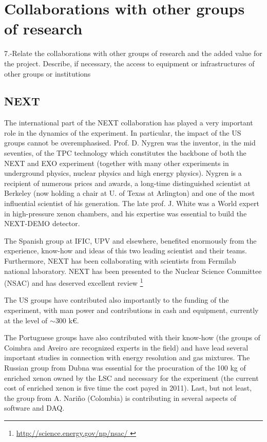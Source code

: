 \documentclass[a4paper,11pt,oneside]{article}
\begin{document}
\section{\bf \textsf{Collaborations with other groups of research}}

7.-Relate the collaborations with other groups of research and the added value for the project. Describe, if necessary, the access to equipment or infrastructures of other groups or institutions

\subsection*{NEXT}

The international part of the NEXT collaboration has played a very important role in the dynamics of the experiment. In particular, the impact of the US groups cannot be overemphasised. Prof. D. Nygren was the inventor, in the mid seventies, of the TPC technology which constitutes the backbone of both the NEXT and EXO experiment (together with many other experiments in underground physics, nuclear physics and high energy physics). Nygren is a recipient of numerous prices and awards, a long-time distinguished scientist at Berkeley (now holding a chair at U. of Texas at Arlington) and one of the most influential scientist of his generation. The late prof. J. White was a World expert in high-pressure xenon chambers, and his expertise was essential to build the NEXT-DEMO detector.

The Spanish group at IFIC, UPV and elsewhere, benefited enormously from the experience, know-how and ideas of this two leading scientist and their teams. Furthermore, NEXT has been collaborating with scientists from Fermilab national laboratory. NEXT has been presented to the Nuclear Science Committee (NSAC) and has deserved excellent review
\footnote{\url{http://science.energy.gov/np/nsac/
}}

The US groups have contributed also importantly to the funding of the experiment, with man power and contributions in cash and equipment, currently at the level of $\sim$300 k\euro. 

The Portuguese groups have also contributed with their know-how (the groups of Coimbra and Aveiro are recognized experts in the field) and have lead several important studies in connection with energy resolution and gas mixtures. The Russian group from Dubna was essential for the procuration of the 100 kg of enriched xenon owned by the LSC and necessary for the experiment (the current cost of enriched xenon is five time the cost payed in 2011). Last, but not least, the group from A. Nari\~no (Colombia) is contributing in several aspects of software and DAQ. 
\end{document}
